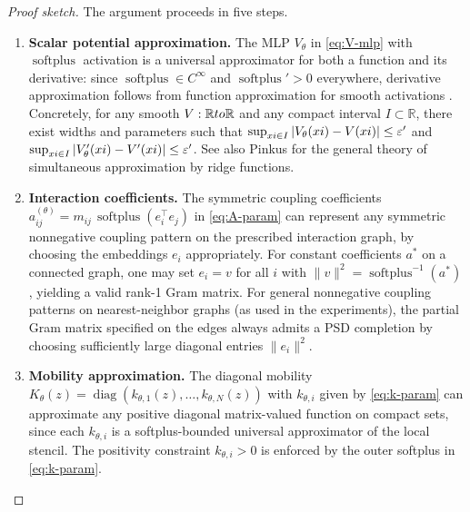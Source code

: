 \documentclass[hidelinks,review,nohypdvips,onefignum,onetabnum]{siamart220329}
\newcommand{\R}{\mathbb{R}}
\newcommand{\diag}{\operatorname{diag}}
\newcommand{\softplus}{\operatorname{softplus}}
\begin{document}
\begin{proof}[Proof sketch]
The argument proceeds in five steps.
\begin{enumerate}
    \item \textbf{Scalar potential approximation.} The MLP $V_{\theta}$ in \eqref{eq:V-mlp} with $\softplus$ activation is a universal approximator for both a function and its derivative: since $\softplus\in C^{\infty}$ and $\softplus'>0$ everywhere, derivative approximation follows from function approximation for smooth activations \cite{Cybenko1989,Hornik1991Approximation}. Concretely, for any smooth $V:\R\\to\R$ and any compact interval $I\subset\R$, there exist widths and parameters such that $\sup_{\\xi\in I}|V_{\theta}(\\xi)-V(\\xi)|\le \varepsilon'$ and $\sup_{\\xi\in I}|V_{\theta}'(\\xi)-V'(\\xi)|\le \varepsilon'$. See also Pinkus \cite{Pinkus1999Approximation} for the general theory of simultaneous approximation by ridge functions.

    \item \textbf{Interaction coefficients.} The symmetric coupling coefficients $a_{ij}^{(\theta)}=m_{ij}\,\softplus(e_i^\top e_j)$ in \eqref{eq:A-param} can represent any symmetric nonnegative coupling pattern on the prescribed interaction graph, by choosing the embeddings $e_i$ appropriately. For constant coefficients $a^*$ on a connected graph, one may set $e_i=v$ for all $i$ with $\|v\|^2=\softplus^{-1}(a^*)$, yielding a valid rank-1 Gram matrix. For general nonnegative coupling patterns on nearest-neighbor graphs (as used in the experiments), the partial Gram matrix specified on the edges always admits a PSD completion by choosing sufficiently large diagonal entries $\|e_i\|^2$.

    \item \textbf{Mobility approximation.} The diagonal mobility $K_{\theta}(z)=\diag(k_{\theta,1}(z),\dots,k_{\theta,N}(z))$ with $k_{\theta,i}$ given by \eqref{eq:k-param} can approximate any positive diagonal matrix-valued function on compact sets, since each $k_{\theta,i}$ is a softplus-bounded universal approximator of the local stencil. The positivity constraint $k_{\theta,i}>0$ is enforced by the outer softplus in \eqref{eq:k-param}.


\end{enumerate}
\end{proof}
\end{document}
